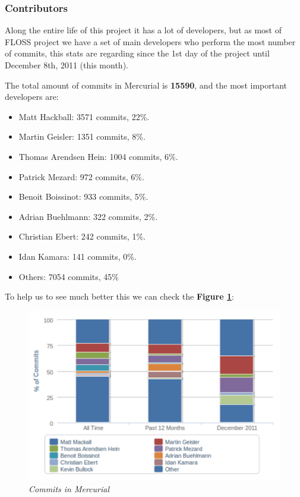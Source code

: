 \documentclass[a4paper,10pt]{article}
\begin{document}
\subsubsection{Contributors} \label{Contributors}

Along the entire life of this project it has a lot of developers, but as most of
FLOSS project we have a set of main developers who perform the most number of
commits, this stats are regarding since the 1st day of the project until
December 8th, 2011 (this month).

The total amount of commits in Mercurial is \textbf{15590}, and the most
important developers are:

\begin{itemize}
 \item Matt Hackball: 3571 commits, 22\%.
 \item Martin Geisler: 1351 commits, 8\%.
 \item Thomas Arendsen Hein: 1004 commits, 6\%.
 \item Patrick Mezard: 972 commits, 6\%.
 \item Benoit Boissinot: 933 commits, 5\%.
 \item Adrian Buehlmann: 322 commits, 2\%.
 \item Christian Ebert: 242 commits, 1\%.
 \item Idan Kamara: 141 commits, 0\%.
 \item Others: 7054 commits, 45\%
\end{itemize}

To help us to see much better this we can check the \textbf{Figure
\ref{figure:mercurial_commits}}:

\begin{figure}[H]
    \centering
    \includegraphics[width=12cm, keepaspectratio]{img/mercurial_commits.pdf}
    \caption{\textit{Commits in Mercurial}}
    \label{figure:mercurial_commits}
 \end{figure}
\end{document}
